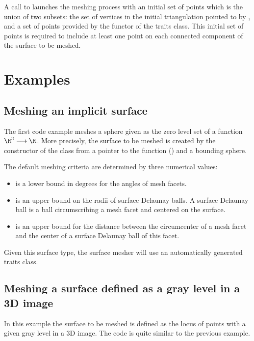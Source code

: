 A call to 
 launches 
the meshing process with an initial 
set of points which is the union of two subsets:
the set of vertices in the  initial triangulation pointed to by ,
and a set of points provided by the  functor 
of the traits class. This initial set of points is required 
to include at least one point on each connected component of the surface
to be meshed.


\section{Examples}
\label{SurfaceMesher_section_example}

\subsection{Meshing an implicit surface}
The first code example meshes a sphere 
given as the zero level set of a function $\R^3 \longrightarrow \R$.
More precisely, 
the surface to be meshed is created 
by the constructor
of the class 
from a pointer to the function ()
and a bounding sphere.

The default meshing criteria are determined  by three numerical
values: 
\begin{itemize}
\item {} is a lower bound in degrees for the angles 
     of mesh facets.
\item {} is an upper bound on the radii of surface Delaunay
balls. A surface Delaunay ball is a ball circumscribing a mesh facet
and centered on the surface. 
\item {} is an upper bound for the distance 
between the circumcenter of a mesh facet and the center of a surface
Delaunay ball of this facet.
\end{itemize}


Given this surface type, the surface mesher will use
an automatically generated traits class.


\subsection{Meshing a surface defined as a gray level in a 3D image}
In this example the surface to be meshed is defined
as the locus of points with a given gray level
in a 3D image.
The code is quite similar to the previous example. 

